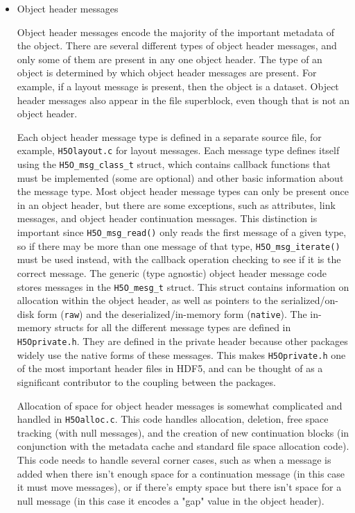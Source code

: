 \begin{itemize}
    \item Object header messages

Object header messages encode the majority of the important metadata of the object. There are several different types of object header messages, and only some of them are present in any one object header. The type of an object is determined by which object header messages are present. For example, if a layout message is present, then the object is a dataset. Object header messages also appear in the file superblock, even though that is not an object header.

Each object header message type is defined in a separate source file, for example, \texttt{H5Olayout.c} for layout messages. Each message type defines itself using the \texttt{H5O\_msg\_class\_t} struct, which contains callback functions that must be implemented (some are optional) and other basic information about the message type. Most object header message types can only be present once in an object header, but there are some exceptions, such as attributes, link messages, and object header continuation messages. This distinction is important since \texttt{H5O\_msg\_read()} only reads the first message of a given type, so if there may be more than one message of that type, \texttt{H5O\_msg\_iterate()} must be used instead, with the callback operation checking to see if it is the correct message. The generic (type agnostic) object header message code stores messages in the \texttt{H5O\_mesg\_t} struct. This struct contains information on allocation within the object header, as well as pointers to the serialized/on-disk form (\texttt{raw}) and the deserialized/in-memory form (\texttt{native}). The in-memory structs for all the different message types are defined in \texttt{H5Oprivate.h}. They are defined in the private header because other packages widely use the native forms of these messages. This makes \texttt{H5Oprivate.h} one of the most important header files in HDF5, and can be thought of as a significant contributor to the coupling between the packages.

Allocation of space for object header messages is somewhat complicated and handled in \texttt{H5Oalloc.c}. This code handles allocation, deletion, free space tracking (with null messages), and the creation of new continuation blocks (in conjunction with the metadata cache and standard file space allocation code). This code needs to handle several corner cases, such as when a message is added when there isn't enough space for a continuation message (in this case it must move messages), or if there's empty space but there isn't space for a null message (in this case it encodes a "gap" value in the object header).


\end{itemize}
